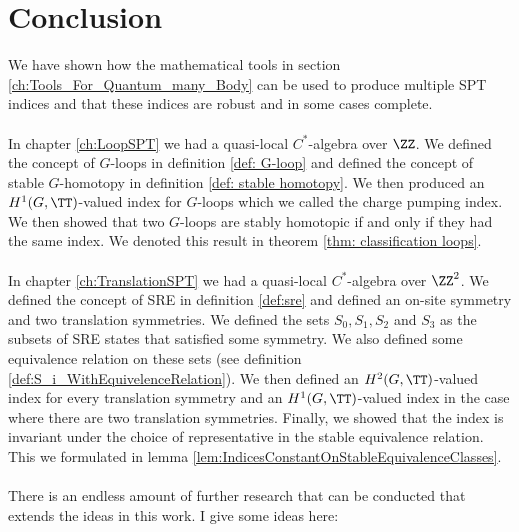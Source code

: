 \chapter{Conclusion}\label{ch:conclusion}

We have shown how the mathematical tools in section \ref{ch:Tools_For_Quantum_many_Body} can be used to produce multiple SPT indices and that these indices are robust and in some cases complete.
\\\\
In chapter \ref{ch:LoopSPT} we had a quasi-local $C^*$-algebra over $\ZZ$. We defined the concept of $G$-loops in definition \ref{def: G-loop} and defined the concept of stable $G$-homotopy in definition \ref{def: stable homotopy}. We then produced an $H^1(G,\TT)$-valued index for $G$-loops which we called the charge pumping index. We then showed that two $G$-loops are stably homotopic if and only if they had the same index. We denoted this result in theorem \ref{thm: classification loops}.
\\\\
In chapter \ref{ch:TranslationSPT} we had a quasi-local $C^*$-algebra over $\ZZ^2$. We defined the concept of SRE in definition \ref{def:sre} and defined an on-site symmetry and two translation symmetries. We defined the sets $S_0,S_1,S_2$ and $S_3$ as the subsets of SRE states that satisfied some symmetry. We also defined some equivalence relation on these sets (see definition \ref{def:S_i_WithEquivelenceRelation}). We then defined an $H^2(G,\TT)$-valued index for every translation symmetry and an $H^1(G,\TT)$-valued index in the case where there are two translation symmetries. Finally, we showed that the index is invariant under the choice of representative in the stable equivalence relation. This we formulated in lemma \ref{lem:IndicesConstantOnStableEquivalenceClasses}.
\\\\
There is an endless amount of further research that can be conducted that extends the ideas in this work. I give some ideas here:
